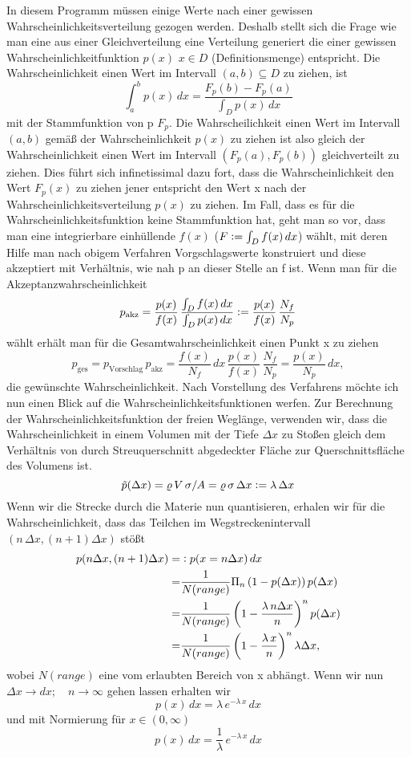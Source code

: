 \documentclass[12pt]{article}
\begin{document}
In diesem Programm müssen einige Werte nach einer gewissen Wahrscheinlichkeitsverteilung gezogen werden. Deshalb stellt sich die Frage wie man eine aus einer Gleichverteilung eine Verteilung generiert die einer gewissen Wahrscheinlichkeitfunktion $p(x)$ $x\in{D}$ (Definitionsmenge) entspricht. Die Wahrscheinlichkeit einen Wert im Intervall $(a,b)\subseteq{D}$ zu ziehen, ist 
$$\int_a^bp(x)\,dx=\frac{F_p(b)-F_p(a)}{\int_Dp(x)\,dx}$$
mit der Stammfunktion von p $F_p$. Die Wahrscheilichkeit einen Wert im Intervall $(a,b)$ gemäß der Wahrscheinlichkeit $p(x)$ zu ziehen ist also gleich der Wahrscheinlichkeit einen Wert im Intervall $(F_p(a),F_p(b))$ gleichverteilt zu ziehen. Dies führt sich infinetissimal dazu fort, dass die Wahrscheinlichkeit den Wert $F_p(x)$ zu ziehen jener entspricht den Wert x nach der Wahrscheinlichkeitsverteilung $p(x)$ zu ziehen. 
Im Fall, dass es für die Wahrscheinlichkeitsfunktion keine Stammfunktion hat, geht man so vor, dass man eine integrierbare einhüllende $f(x)$ ($F\vcentcolon=\int_Df(x)\,dx$) wählt, mit deren Hilfe man nach obigem Verfahren Vorgschlagswerte konstruiert und diese akzeptiert mit Verhältnis, wie nah p an dieser Stelle an f ist. Wenn man für die Akzeptanzwahrscheinlichkeit 
$$p_\text{akz}=\frac{p(x)}{f(x)}\,\frac{\int_Df(x)\,dx}{\int_Dp(x)\,dx}\vcentcolon=\frac{p(x)}{f(x)}\,\frac{N_f}{N_p}$$
wählt erhält man für die Gesamtwahrscheinlichkeit einen Punkt x zu ziehen
$$p_\text{ges}=p_\text{Vorschlag}\,p_\text{akz}=\frac{f(x)}{N_f}\,dx\,\frac{p(x)}{f(x)}\,\frac{N_f}{N_p}=\frac{p(x)}{N_p}\,dx,$$
die gewünschte Wahrscheinlichkeit.
Nach Vorstellung des Verfahrens möchte ich nun einen Blick auf die Wahrscheinlichkeitsfunktionen werfen. Zur Berechnung der Wahrscheinlichkeitsfunktion der freien Weglänge, verwenden wir, dass die Wahrscheinlichkeit in einem Volumen mit der Tiefe $\Delta{x}$ zu Stoßen gleich dem Verhältnis von durch Streuquerschnitt abgedeckter Fläche zur Querschnittsfläche des Volumens ist.
$$\tilde{p}(\Delta{x})=\varrho\,V\,\sigma/A=\varrho\,\sigma\,\Delta{x}\vcentcolon=\lambda\,\Delta{x}$$
Wenn wir die Strecke durch die Materie nun quantisieren, erhalen wir für die Wahrscheinlichkeit, \newline
dass das Teilchen im Wegstreckenintervall $(n\,\Delta{x},(n+1)\Delta{x})$ stößt
\begin{align*}
    p(n\Delta{x},(n+1)\Delta{x})=&\vcentcolon{p}(x=n\Delta{x})\,dx\\
    =&\frac{1}{N(range)}\Pi_n\left(1-p(\Delta{x})\right)p(\Delta{x})\\
    =&\frac{1}{N(range)}\left(1-\frac{\lambda\,n\Delta{x}}{n}\right)^np(\Delta{x})\\
    =&\frac{1}{N(range)}\left(1-\frac{\lambda\,x}{n}\right)^n\lambda\Delta{x},
\end{align*}
wobei $N(range)$ eine vom erlaubten Bereich von x abhängt. Wenn wir nun $\Delta{x}\rightarrow{dx};\quad n\rightarrow\infty$ gehen lassen erhalten wir
$$p(x)\,dx=\lambda\,e^{-\lambda\,x}\,dx$$
und mit Normierung für $x\in(0,\infty)$
$$p(x)\,dx=\frac{1}{\lambda}\,e^{-\lambda\,x}\,dx$$
\end{document}
